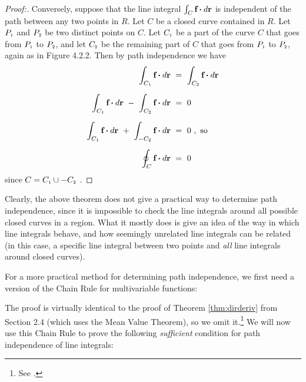 \begin{proofbar}
\begin{proof}[Proof:]
 \par\vspace{-15mm}
 Conversely, suppose that the line integral $\int_{C} \textbf{f} \bm{\cdot} d\textbf{r}$ is independent of the path
 between any two points in $R$. Let $C$ be a closed curve contained in $R$. Let $P_{\scriptscriptstyle 1}$ and $P_{\scriptscriptstyle 2}$ be two
 distinct points on $C$. Let $C_{\scriptscriptstyle 1}$ be a part of the curve $C$ that goes from $P_{\scriptscriptstyle 1}$ to $P_{\scriptscriptstyle 2}$, and
 let $C_{\scriptscriptstyle 2}$ be the remaining part of $C$ that goes from $P_{\scriptscriptstyle 1}$ to $P_{\scriptscriptstyle 2}$, again as in Figure 4.2.2.
 Then by path independence we have
 \begin{align*}
  \int_{C_{\scriptscriptstyle 1}} \textbf{f} \bm{\cdot} d\textbf{r} ~&=~ \int_{C_{\scriptscriptstyle 2}} \textbf{f} \bm{\cdot} d\textbf{r}\\[6pt]
  \int_{C_{\scriptscriptstyle 1}} \textbf{f} \bm{\cdot} d\textbf{r} ~-~ \int_{C_{\scriptscriptstyle 2}} \textbf{f} \bm{\cdot} d\textbf{r} ~&=~ 0\\[6pt]
  \int_{C_{\scriptscriptstyle 1}} \textbf{f} \bm{\cdot} d\textbf{r} ~+~ \int_{-C_{\scriptscriptstyle 2}} \textbf{f} \bm{\cdot} d\textbf{r} ~&=~ 0 ~,~\text{so}\\[6pt]
  \oint_{C} \textbf{f} \bm{\cdot} d\textbf{r} ~&=~ 0
 \end{align*}
 since $C = C_{\scriptscriptstyle 1} \cup -C_{\scriptscriptstyle 2}$ . \qedhere
 \vspace{-3mm}
\end{proof}\end{proofbar}

Clearly, the above theorem does not give a practical way to determine path independence, since it is impossible to
check the line integrals around all possible closed curves in a region.
What it mostly does is give an idea of the
way in which line integrals behave, and how seemingly unrelated line integrals can be related (in this case, a
specific line integral between two points and \emph{all} line integrals around closed curves).

For a more practical method for determining path independence, we first need a version of the Chain Rule for
multivariable functions:

The proof is virtually identical to the proof of Theorem \ref{thm:dirderiv} from Section 2.4 (which uses the Mean
Value Theorem), so we omit it.\footnote{See \cite[\S\,6.5]{tm}.} We will now use this Chain Rule to prove the
following \emph{sufficient} condition for path independence of line integrals:

